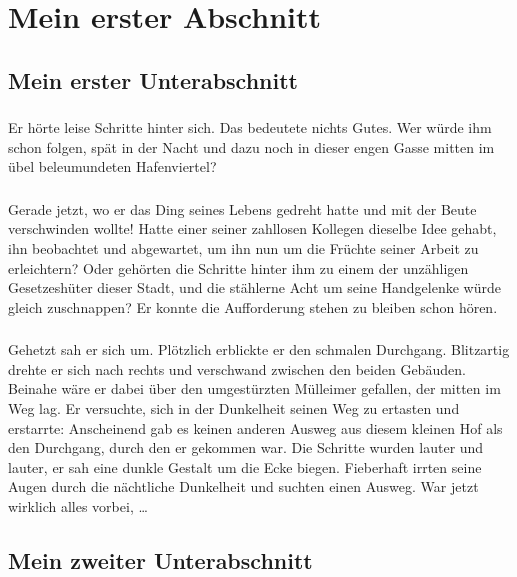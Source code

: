 
\section{Mein erster Abschnitt}\label{sec:abschnitt1}
%
\subsection{Mein erster Unterabschnitt}
\subsubsection{}
Er hörte leise Schritte hinter sich. 
Das bedeutete nichts Gutes. 
Wer würde ihm schon folgen, spät in der Nacht und dazu noch in dieser engen Gasse mitten im übel beleumundeten Hafenviertel? 
\subsubsection{}
Gerade jetzt, wo er das Ding seines Lebens gedreht hatte und mit der Beute verschwinden wollte! 
Hatte einer seiner zahllosen Kollegen dieselbe Idee gehabt, ihn beobachtet und abgewartet, um ihn nun um die Früchte seiner Arbeit zu erleichtern? 
Oder gehörten die Schritte hinter ihm zu einem der unzähligen Gesetzeshüter dieser Stadt, und die stählerne Acht um seine Handgelenke würde gleich zuschnappen? 
Er konnte die Aufforderung stehen zu bleiben schon hören. 
\subsubsection{}
Gehetzt sah er sich um. Plötzlich erblickte er den schmalen Durchgang. Blitzartig drehte er sich nach rechts und verschwand zwischen den beiden Gebäuden. 
Beinahe wäre er dabei über den umgestürzten Mülleimer gefallen, der mitten im Weg lag. 
Er versuchte, sich in der Dunkelheit seinen Weg zu ertasten und erstarrte: Anscheinend gab es keinen anderen Ausweg aus diesem kleinen Hof als den Durchgang, durch den er gekommen war. 
Die Schritte wurden lauter und lauter, er sah eine dunkle Gestalt um die Ecke biegen. 
Fieberhaft irrten seine Augen durch die nächtliche Dunkelheit und suchten einen Ausweg. 
War jetzt wirklich alles vorbei, \ldots
\subsection{Mein zweiter Unterabschnitt}
